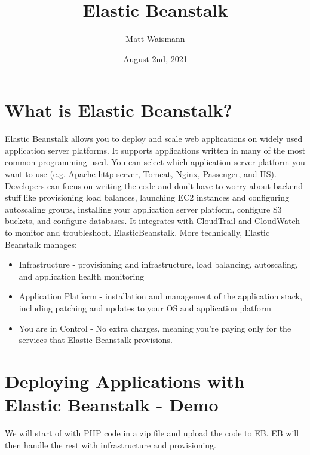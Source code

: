 \documentclass{article}%
\title{Elastic Beanstalk}
\date{August 2nd, 2021}
\author{Matt Waismann}
\begin{document}
\maketitle
\section{What is Elastic Beanstalk?}
Elastic Beanstalk allows you to deploy and scale web applications on widely used application server platforms. It supports applications written in many of the most common programming used.
You can select which application server platform you want to use (e.g. Apache http server, Tomcat, Nginx, Passenger, and IIS). Developers can focus on writing the code and don't have to worry
about backend stuff like provisioning load balances, launching EC2 instances and configuring autoscaling groups, installing your application server platform, configure S3 buckets, and configure databases. 
It integrates with CloudTrail and CloudWatch to monitor and troubleshoot. ElasticBeanstalk. More technically, Elastic Beanstalk manages:
\begin{itemize}
    \item Infrastructure - provisioning and infrastructure, load balancing, autoscaling, and application health monitoring
    \item Application Platform - installation and management of the application stack, including patching and updates to your OS and application platform
    \item You are in Control - No extra charges, meaning you're paying only for the services that Elastic Beanstalk provisions. 
\end{itemize}

\section{Deploying Applications with Elastic Beanstalk - Demo}
We will start of with PHP code in a zip file and upload the code to EB. EB will then handle the rest with infrastructure and provisioning. 
\end{document}
